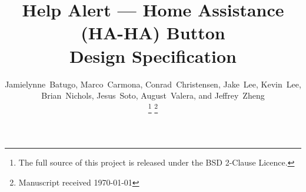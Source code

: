 \documentclass[journal,compsoc]{IEEEtran}
\begin{document}
%
\title{
  Help Alert --- Home Assistance (HA-HA) Button \\
  Design Specification
}
%
%
%

\author{Jamielynne~Batugo, Marco~Carmona, Conrad~Christensen, Jake~Lee, Kevin~Lee, Brian~Nichols, Jesus~Soto, August~Valera, and Jeffrey~Zheng%

\thanks{The full source of this project is released under the BSD 2-Clause Licence.}
\thanks{Manuscript received \today}}

%
%
\end{document}
